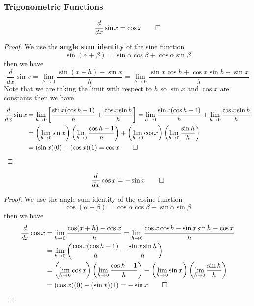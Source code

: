 \subsubsection{Trigonometric Functions}
\begin{theorem}
    \[\frac{d}{dx}\sin x=\cos x\qedhere\]
\end{theorem}
\begin{proof}
    We use the \textbf{angle sum identity} of the sine function
    \[\sin(\alpha+\beta)=\sin\alpha\cos\beta+\cos\alpha\sin\beta\]
    then we have
    \[\frac{d}{dx}\sin x=\lim_{h\to 0}\frac{\sin(x+h)-\sin x}{h}
    =\lim_{h\to 0}\frac{\sin x\cos h+\cos x\sin h-\sin x}{h}\]
    Note that we are taking the limit with respect to \(h\) so \(\sin x\) and
    \(\cos x\) are constants then we have
    \begin{align*}
        \frac{d}{dx}\sin x
        &= \lim_{h\to 0}\left[\frac{\sin x(\cos h-1)}{h}
        +\frac{\cos x\sin h}{h}\right]
        =\lim_{h\to 0}\frac{\sin x(\cos h-1)}{h}
        +\lim_{h\to 0}\frac{\cos x\sin h}{h}  \\
        &= \left(\lim_{h\to 0}\sin x\right)
        \left(\lim_{h\to 0}\frac{\cos h-1}{h}\right)
        +\left(\lim_{h\to 0}\cos x\right)
        \left(\lim_{h\to 0}\frac{\sin h}{h}\right)  \\
        &= (\sin x)(0)+(\cos x)(1) =\cos x\qedhere
    \end{align*}
\end{proof}
\begin{theorem}
    \[\frac{d}{dx}\cos x=-\sin x\qedhere\]
\end{theorem}
\begin{proof}
    We use the angle sum identity of the cosine function
    \[\cos(\alpha+\beta)=\cos\alpha\cos\beta-\sin\alpha\sin\beta\]
    then we have
    \begin{align*}
        \frac{d}{dx}\cos x
        &= \lim_{h\to 0}\frac{\cos(x+h)-\cos x}{h}
        =\lim_{h\to 0}\frac{\cos x\cos h-\sin x\sin h-\cos x}{h}  \\
        &= \lim_{h\to 0}\left(\frac{\cos x(\cos h-1)}{h}
        -\frac{\sin x\sin h}{h}\right)  \\
        &= \left(\lim_{h\to 0}\cos x\right)
        \left(\lim_{h\to 0}\frac{\cos h-1}{h}\right)
        -\left(\lim_{h\to 0}\sin x\right)
        \left(\lim_{h\to 0}\frac{\sin h}{h}\right)  \\
        &= (\cos x)(0)-(\sin x)(1)=-\sin x\qedhere
    \end{align*}
\end{proof}
